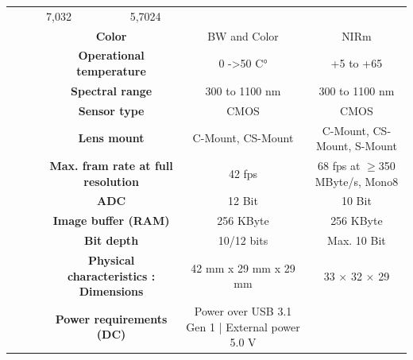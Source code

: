 \begin{table}[H]
{\begin{tabular}{ccc|cc|cc|}
  \multicolumn{2}{c|}{7,032} &
  \multicolumn{2}{c|}{5,7024} \\
\multicolumn{1}{|c|}{} &
  \multicolumn{2}{c|}{\cellcolor[HTML]{EFEFEF}\textbf{Color}} &
  \multicolumn{2}{c|}{\cellcolor[HTML]{EFEFEF}BW and Color} &
  \multicolumn{2}{c|}{\cellcolor[HTML]{EFEFEF}NIRm} \\
\multicolumn{1}{|c|}{} &
  \multicolumn{2}{c|}{\textbf{Operational temperature}} &
  \multicolumn{2}{c|}{0 -\textgreater 50 C°} &
  \multicolumn{2}{c|}{+5 to +65} \\
\multicolumn{1}{|c|}{} &
  \multicolumn{2}{c|}{\cellcolor[HTML]{EFEFEF}\textbf{Spectral range}} &
  \multicolumn{2}{c|}{\cellcolor[HTML]{EFEFEF}300 to 1100 nm} &
  \multicolumn{2}{c|}{\cellcolor[HTML]{EFEFEF}300 to 1100 nm} \\
\multicolumn{1}{|c|}{} &
  \multicolumn{2}{c|}{\textbf{Sensor type}} &
  \multicolumn{2}{c|}{CMOS} &
  \multicolumn{2}{c|}{CMOS} \\
\multicolumn{1}{|c|}{} &
  \multicolumn{2}{c|}{\cellcolor[HTML]{EFEFEF}\textbf{Lens mount}} &
  \multicolumn{2}{c|}{\cellcolor[HTML]{EFEFEF}C-Mount, CS-Mount} &
  \multicolumn{2}{c|}{\cellcolor[HTML]{EFEFEF}C-Mount, CS-Mount, S-Mount} \\
\multicolumn{1}{|c|}{} &
  \multicolumn{2}{c|}{\textbf{Max. fram rate at full resolution}} &
  \multicolumn{2}{c|}{42 fps} &
  \multicolumn{2}{c|}{68 fps at $\geq$350 MByte/s, Mono8} \\
\multicolumn{1}{|c|}{} &
  \multicolumn{2}{c|}{\cellcolor[HTML]{EFEFEF}\textbf{ADC}} &
  \multicolumn{2}{c|}{\cellcolor[HTML]{EFEFEF}12 Bit} &
  \multicolumn{2}{c|}{\cellcolor[HTML]{EFEFEF}10 Bit} \\
\multicolumn{1}{|c|}{} &
  \multicolumn{2}{c|}{\textbf{Image buffer (RAM)}} &
  \multicolumn{2}{c|}{256 KByte} &
  \multicolumn{2}{c|}{256 KByte} \\
\multicolumn{1}{|c|}{} &
  \multicolumn{2}{c|}{\cellcolor[HTML]{EFEFEF}\textbf{Bit depth}} &
  \multicolumn{2}{c|}{\cellcolor[HTML]{EFEFEF}10/12 bits} &
  \multicolumn{2}{c|}{\cellcolor[HTML]{EFEFEF}Max. 10 Bit} \\
\multicolumn{1}{|c|}{} &
  \multicolumn{2}{c|}{\textbf{Physical characteristics : Dimensions}} &
  \multicolumn{2}{c|}{42 mm x 29 mm x 29 mm} &
  \multicolumn{2}{c|}{33 $\times$ 32 $\times$ 29} \\
\multicolumn{1}{|c|}{} &
  \multicolumn{2}{c|}{\cellcolor[HTML]{EFEFEF}\textbf{Power requirements (DC)}} &
  \multicolumn{2}{c|}{\cellcolor[HTML]{EFEFEF}Power over USB 3.1 Gen 1 | External power 5.0 V} &

\end{tabular}}
\end{table}
